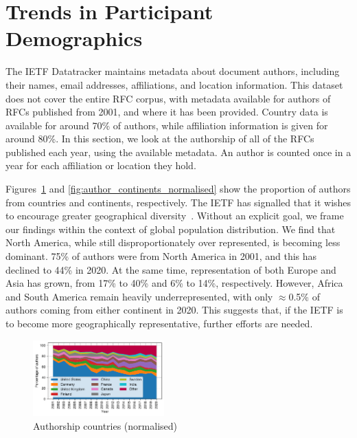 \documentclass[twocolumn,10pt]{article}
\newcommand{\pb}[1]{\vspace{0.75ex}\noindent{\textbf{#1}}}
\begin{document}
\section{Trends in Participant Demographics}



The IETF Datatracker maintains metadata about document authors, including
their names, email addresses, affiliations, and location information. This
dataset does not cover the entire RFC corpus, with metadata available for
authors of RFCs published from 2001, and where it has been provided.
Country data is available for around 70\% of authors, while affiliation
information is given for around 80\%. In this section, we look at the
authorship of all of the RFCs published each year, using the available
metadata. An author is counted once in a year for each affiliation or
location they hold.

\pb{Geographic Distribution of Authors:}
Figures~\ref{fig:author_countries_normalised} and
\ref{fig:author_continents_normalised} show the proportion of authors from
countries and continents, respectively. The IETF has signalled that it
wishes to encourage greater geographical diversity~\cite{rfc7704,
ietfblog:diversity}. Without an explicit goal, we frame our findings within
the context of global population distribution.  We find that North America,
while still disproportionately over represented, is becoming less dominant.
75\% of authors were from North America in 2001, and this has declined to
44\% in 2020. At the same time, representation of both Europe and Asia has
grown, from 17\% to 40\% and 6\% to 14\%, respectively.  However, Africa
and South America remain heavily underrepresented, with only $\approx$0.5\%
of authors coming from either continent in 2020.  This suggests that, if
the IETF is to become more geographically representative, further efforts
are needed.

\begin{figure}
\includegraphics[width=0.45\textwidth]{figures-prev/imc-2021/authors/top5_countries_normalised.pdf}
\caption{Authorship countries (normalised)}
\label{fig:author_countries_normalised}
\end{figure}
\end{document}
